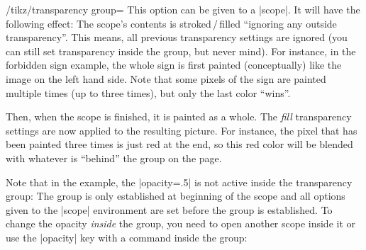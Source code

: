 \begin{key}{/tikz/transparency group=}
    This option can be given to a |scope|. It will have the following effect:
    The scope's contents is stroked\,/\,filled ``ignoring any outside
    transparency''. This means, all previous transparency settings are ignored
    (you can still set transparency inside the group, but never mind). For
    instance, in the forbidden sign example, the whole sign is first painted
    (conceptually) like the image on the left hand side. Note that some pixels
    of the sign are painted multiple times (up to three times), but only the
    last color ``wins''.

    Then, when the scope is finished, it is painted as a whole. The \emph{fill}
    transparency settings are now applied to the resulting picture. For
    instance, the pixel that has been painted three times is just red at the
    end, so this red color will be blended with whatever is ``behind'' the
    group on the page.
\begin{codeexample}[preamble={\usetikzlibrary{patterns,shapes.symbols}},svg]
\end{codeexample}

    Note that in the example, the |opacity=.5| is not active inside the
    transparency group: The group is only established at beginning of the scope
    and all options given to the |{scope}| environment are set before the group
    is established. To change the opacity \emph{inside} the group, you need to
    open another scope inside it or use the |opacity| key with a command inside
    the group:
\begin{codeexample}[preamble={\usetikzlibrary{patterns,shapes.symbols}},svg]
\end{codeexample}
\end{key}
